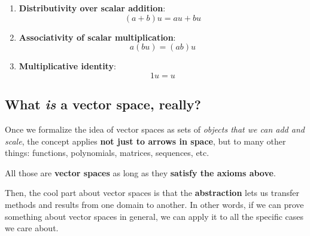 \begin{itemize}
\begin{enumerate}
        \item \textbf{Distributivity over scalar addition}:
        \begin{equation}
            (a + b)u = au + bu
        \end{equation}
        \item \textbf{Associativity of scalar multiplication}:
        \begin{equation}
            a(bu) = (ab)u
        \end{equation}
        \item \textbf{Multiplicative identity}:
        \begin{equation}
            1u = u
        \end{equation}
    \end{enumerate}

\end{itemize}

\subsection{What \textit{is} a vector space, really?}
\label{subsec:what-is-a-vector-space}

Once we formalize the idea of vector spaces as sets of \textit{objects that we can add and scale}, the
concept applies \textbf{not just to arrows in space}, but to many other things: functions, polynomials,
matrices, sequences, etc.

All those are \textbf{vector spaces} as long as they \textbf{satisfy the axioms above}.

Then, the cool part about vector spaces is that the \textbf{abstraction} lets us transfer methods
and results from one domain to another. In other words, if we can prove something about vector spaces in
general, we can apply it to all the specific cases we care about.
